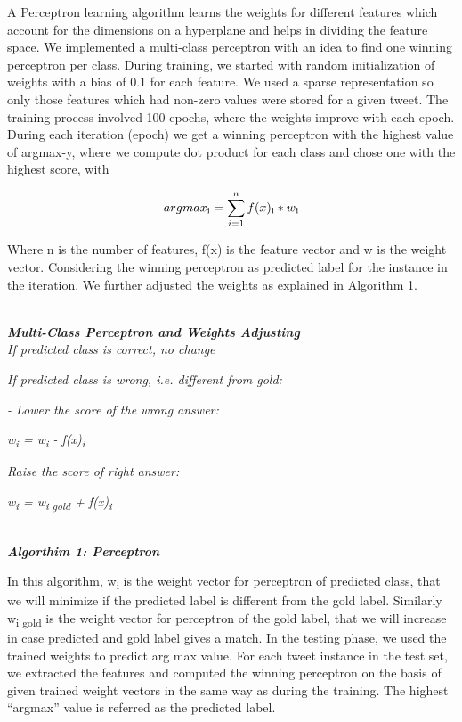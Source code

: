 \documentclass[11pt]{article}
\begin{document}
  A Perceptron learning algorithm learns the weights for different features which account for the dimensions on a hyperplane and helps in dividing the feature space. We implemented a multi-class perceptron with an idea to find one winning perceptron per class.
    During training, we started with random initialization of weights with a bias of 0.1 for each feature. We used a sparse representation so only those features which had non-zero values were stored for a given tweet. The training process involved 100 epochs, where the weights improve with each epoch. During each iteration (epoch) we get a winning perceptron with the highest value of argmax-y, where we compute dot product for each class and chose one with the highest score, with
  {$$arg max\textsubscript{i} = \sum_{i=1}\limits ^n f(x)\textsubscript{i} * w\textsubscript{i}$$
  
  Where n is the number of features, f(x) is the feature vector and w is the weight vector. Considering the winning perceptron as predicted label for the instance in the iteration. We further adjusted the weights as explained in Algorithm 1.
  
  \noindent\hrulefill\\
   \textbf{\emph {Multi-Class Perceptron and Weights Adjusting}} \\
  
  \emph{ If predicted class is correct, no change}
  
  \emph{If predicted class is wrong, i.e. different from gold:}
  
  \emph{- Lower the score of the wrong answer:}
  
  \emph{w\textsubscript{i} = w\textsubscript{i} - f(x)\textsubscript{i}}
  
  \emph{Raise the score of right answer:}
  
  \emph{w\textsubscript{i} = w\textsubscript{i gold} + f(x)\textsubscript{i} }
  
  \noindent\hrulefill\\
  \textbf{\emph{ Algorthim 1: Perceptron }}
  
  In this algorithm, w\textsubscript{i} is the weight vector for perceptron of predicted class, that we will minimize if the predicted label is different from the gold label. Similarly w\textsubscript{i gold} is the weight vector for perceptron of the gold label, that we will increase in case predicted and gold label gives a match.
  In the testing phase, we used the trained weights to predict arg max value. For each tweet instance in the test set, we extracted the features and computed the winning perceptron on the basis of given trained weight vectors in the same way as during the training. The highest “argmax” value is referred as the
  predicted label.\\
  
}
\end{document}
